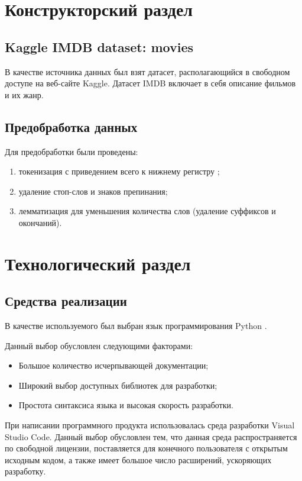 \documentclass[12pt]{report}
\begin{document}
\pagebreak

\chapter{Конструкторский раздел}

\section{Kaggle IMDB dataset: movies}

В качестве источника данных был взят датасет, располагающийся в свободном доступе на веб-сайте Kaggle. Датасет IMDB включает в себя описание фильмов и их жанр.

\section{Предобработка данных}

Для предобработки были проведены:
\begin{enumerate}
    \item токенизация с приведением всего к нижнему регистру ;
    \item удаление стоп-слов и знаков препинания;
    \item лемматизация для уменьшения количества слов (удаление суффиксов и окончаний).
\end{enumerate}

\pagebreak

\chapter{Технологический раздел}

\section{Средства реализации}

В качестве используемого был выбран язык программирования Python \cite{Python}.

Данный выбор обусловлен следующими факторами:
\begin{itemize}
	\item Большое количество исчерпывающей документации;
	\item Широкий выбор доступных библиотек для разработки;
	\item Простота синтаксиса языка и высокая скорость разработки.
\end{itemize} 

При написании программного продукта использовалась среда разработки Visual Studio Code. Данный выбор обусловлен тем, что данная среда распространяется по свободной лицензии, поставляется для конечного пользователя с открытым исходным кодом, а также имеет большое число расширений, ускоряющих разработку.
\end{document}
